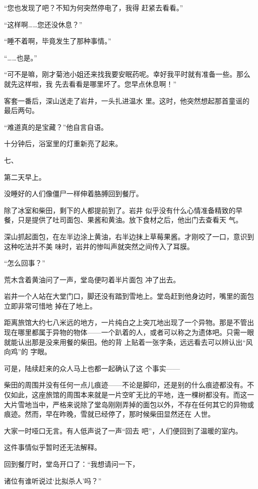 \documentclass{article}
\begin{document}
“您也发现了吧？不知为何突然停电了，我得
赶紧去看看。” 


“这样啊……您还没休息？” 


\newpage

“睡不着啊，毕竟发生了那种事情。” 


“……也是。” 

“可不是嘛，刚才菊池小姐还来找我要安眠药呢。幸好我平时就有准备一些。那么就先这样啦，我
先去看看是哪里坏了。您早点休息啊！” 

客套一番后，深山送走了岩井，一头扎进温水
里。这时，他突然想起那首童谣的最后两句。 


“难道真的是宝藏？”他自言自语。 


十分钟后，浴室里的灯重新亮了起来。 


七、 


第二天早上。 

没睡好的人们像僵尸一样伸着胳膊回到餐厅。

除了冰室和柴田，剩下的人都提前到了。岩井
\newpage
似乎没有什么心情准备精致的早餐，只是提供了吐司面包、果酱和黄油。放下食材之后，他出门去查看天
气。 

深山抓起面包，在左半边涂上黄油，右半边抹上草莓果酱。才刚咬了一口，意识到这种吃法并不美
味时，岩井的惨叫声就突然之间传入了耳膜。 


“怎么回事？” 

荒木含着黄油问了一声，堂岛便叼着半片面包
冲了出去。 

岩井一个人站在大堂门口，脚还没有踏到雪地上。堂岛赶到他身边时，嘴里的面包立即非常可惜地
掉在了地上。 

距离旅馆大约七八米远的地方，一片纯白之上突兀地出现了一个异物。那是不管出现在哪里都属于异物的物体——一个趴着的人，或者可以称之为遗体吧。只需一眼就能认出那是没来用餐的柴田。他的背
\newpage
上贴着一张字条，远远看去可以辨认出“风向鸡”的
字眼。 

可是，陆续赶来的众人马上也都一起确认了这
个事实—— 

柴田的周围并没有任何一点儿痕迹——不论是脚印，还是别的什么痕迹都没有。不仅如此，这座旅馆的周围本来就是一片空旷无比的平地，连一棵树都没有。而这一大片雪地当中，严格来说除了堂岛刚刚弄掉的面包以外，不存在任何其它的异物或痕迹。然而，早在昨晚，雪就已经停了，那时候柴田显然还在
人世。 

大家一时哑口无言。有人低声说了一声“回去
吧”，人们便回到了温暖的室内。 


这件事情似乎暂时还无法解释。 

回到餐厅时，堂岛开口了：“我想请问一下，

\newpage
诸位有谁听说过‘比拟杀人’吗？” 
\end{document}
